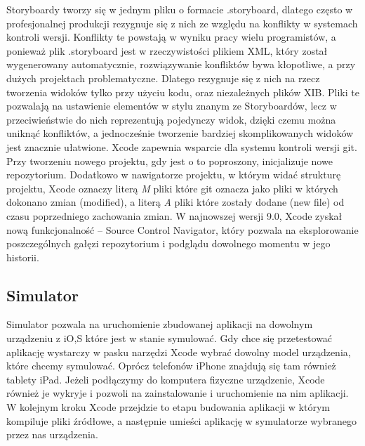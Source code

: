 Storyboardy tworzy się w jednym pliku o formacie .storyboard, dlatego często w profesjonalnej produkcji rezygnuje się z nich ze względu na konflikty w systemach kontroli wersji. Konflikty te powstają w wyniku pracy wielu programistów, a ponieważ plik .storyboard jest w rzeczywistości plikiem XML, który został wygenerowany automatycznie, rozwiązywanie konfliktów bywa kłopotliwe, a przy dużych projektach problematyczne. Dlatego rezygnuje się z nich na rzecz tworzenia widoków tylko przy użyciu kodu, oraz niezależnych plików XIB. Pliki te pozwalają na ustawienie elementów w stylu znanym ze Storyboardów, lecz w przeciwieństwie do nich reprezentują pojedynczy widok, dzięki czemu można uniknąć konfliktów, a jednocześnie tworzenie bardziej skomplikowanych widoków jest znacznie ułatwione. Xcode zapewnia wsparcie dla systemu kontroli wersji git. Przy tworzeniu nowego projektu, gdy jest o to poproszony, inicjalizuje nowe repozytorium. Dodatkowo w nawigatorze projektu, w którym widać strukturę projektu, Xcode oznaczy literą \textit{M} pliki które git oznacza jako pliki w których dokonano zmian (modified), a literą \textit{A} pliki które zostały dodane (new file) od czasu poprzedniego zachowania zmian.
W najnowszej wersji 9.0, Xcode zyskał nową funkcjonalność -- Source Control Navigator, który pozwala na eksplorowanie poszczególnych gałęzi repozytorium i podglądu dowolnego momentu w jego historii.

\subsection{Simulator}

Simulator pozwala na uruchomienie zbudowanej aplikacji na dowolnym urządzeniu z iO,S które jest w stanie symulować. Gdy chce się przetestować aplikację wystarczy w pasku narzędzi Xcode wybrać dowolny model urządzenia, które chcemy symulować. Oprócz telefonów iPhone znajdują się tam również tablety iPad. Jeżeli podłączymy do komputera fizyczne urządzenie, Xcode również je wykryje i pozwoli na zainstalowanie i uruchomienie na nim aplikacji.  W kolejnym kroku Xcode przejdzie to etapu budowania aplikacji w którym kompiluje pliki źródłowe, a następnie umieści aplikację w symulatorze wybranego przez nas urządzenia.


